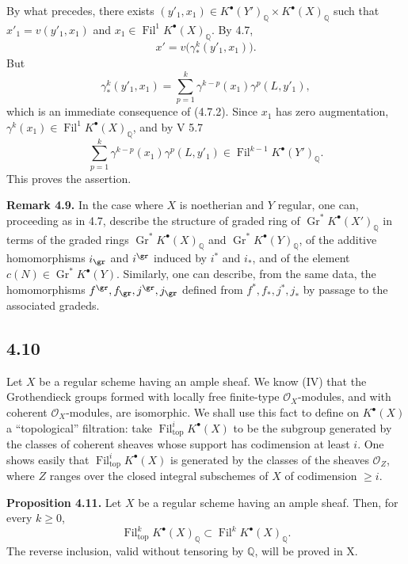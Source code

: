 \documentclass[11pt]{article}
\newcommand{\Fil}{\operatorname{Fil}}
\begin{document}
By what precedes, there exists \((y'_1,x_1)\in K^\bullet(Y')_{\mathbb Q}\times K^\bullet(X)_{\mathbb Q}\) such that \(x'_1=v(y'_1,x_1)\) and \(x_1\in\Fil^1K^\bullet(X)_{\mathbb Q}\). By 4.7,
\[
  x'=v\bigl(\gamma^k_*(y'_1,x_1)\bigr).
\]
But
\[
  \gamma^k_*(y'_1,x_1)
  =
  \sum_{p=1}^{k}\gamma^{k-p}(x_1)\gamma^p(L,y'_1),
\]
which is an immediate consequence of (4.7.2). Since \(x_1\) has zero augmentation, \(\gamma^k(x_1)\in\Fil^1K^\bullet(X)_{\mathbb Q}\), and by V 5.7
\[
  \sum_{p=1}^{k}\gamma^{k-p}(x_1)\gamma^p(L,y'_1)
  \in\Fil^{k-1}K^\bullet(Y')_{\mathbb Q}.
\]
This proves the assertion.

\textbf{Remark 4.9.} In the case where \(X\) is noetherian and \(Y\) regular, one can, proceeding as in 4.7, describe the structure of graded ring of \(\operatorname{Gr}^*K^\bullet(X')_{\mathbb Q}\) in terms of the graded rings \(\operatorname{Gr}^*K^\bullet(X)_{\mathbb Q}\) and \(\operatorname{Gr}^*K^\bullet(Y)_{\mathbb Q}\), of the additive homomorphisms \(i_{\gr}\) and \(i^{\gr}\) induced by \(i^*\) and \(i_*\), and of the element \(c(N)\in\operatorname{Gr}^*K^\bullet(Y)\). Similarly, one can describe, from the same data, the homomorphisms \(f^{\gr}, f_{\gr}, j^{\gr}, j_{\gr}\) defined from \(f^*, f_*, j^*, j_*\) by passage to the associated gradeds.

\subsection*{4.10}

Let \(X\) be a regular scheme having an ample sheaf. We know (IV) that the Grothendieck groups formed with locally free finite-type \(\mathcal O_X\)-modules, and with coherent \(\mathcal O_X\)-modules, are isomorphic. We shall use this fact to define on \(K^\bullet(X)\) a ``topological'' filtration: take \(\Fil_{\mathrm{top}}^iK^\bullet(X)\) to be the subgroup generated by the classes of coherent sheaves whose support has codimension at least \(i\). One shows easily that \(\Fil_{\mathrm{top}}^iK^\bullet(X)\) is generated by the classes of the sheaves \(\mathcal O_Z\), where \(Z\) ranges over the closed integral subschemes of \(X\) of codimension \(\ge i\).

\textbf{Proposition 4.11.} Let \(X\) be a regular scheme having an ample sheaf. Then, for every \(k\ge0\),
\[
  \Fil_{\mathrm{top}}^kK^\bullet(X)_{\mathbb Q}
  \subset
  \Fil^kK^\bullet(X)_{\mathbb Q}.
\]
The reverse inclusion, valid without tensoring by \(\mathbb Q\), will be proved in X.
\end{document}
